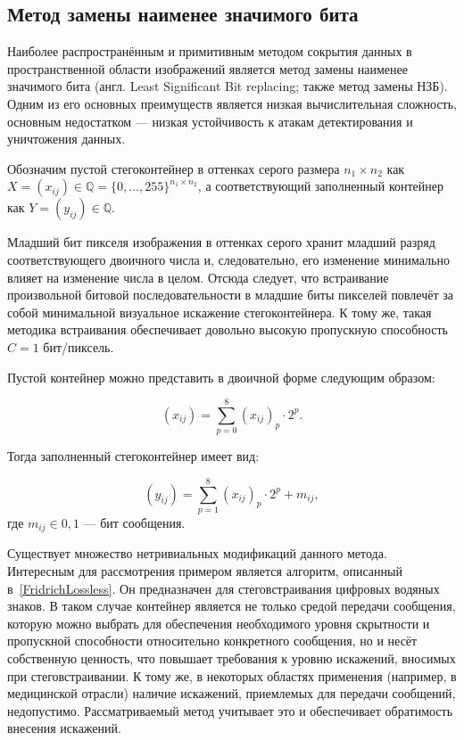 \subsection{Метод замены наименее значимого бита} \label{sec:LSB}

Наиболее распространённым и примитивным методом сокрытия данных в пространственной области изображений является метод замены наименее значимого бита (англ. Least Significant Bit replacing; также метод замены НЗБ). Одним из его основных преимуществ является низкая вычислительная сложность, основным недостатком --- низкая устойчивость к атакам детектирования и уничтожения данных.

Обозначим пустой стегоконтейнер в оттенках серого размера $ {n_1 \times n_2} $ как $ X = (x_{ij}) \in \mathbb{Q} = \{0, \dotsc, 255\}^{n_1 \times n_2} $, а соответствующий заполненный контейнер как $ Y = (y_{ij}) \in \mathbb{Q} $.

Младший бит пикселя изображения в оттенках серого хранит младший разряд соответствующего двоичного числа и, следовательно, его изменение минимально влияет на изменение числа в целом. Отсюда следует, что встраивание произвольной битовой последовательности в младшие биты пикселей повлечёт за собой минимальной визуальное искажение стегоконтейнера. К тому же, такая методика встраивания обеспечивает довольно высокую пропускную способность $ C = 1 $ бит/пиксель.

Пустой контейнер можно представить в двоичной форме следующим образом:

\begin{equation*}
(x_{ij}) = \sum_{p = 0}^8 (x_{ij})_p \cdot 2^p.
\end{equation*}

Тогда заполненный стегоконтейнер имеет вид:

\begin{equation*}
(y_{ij}) = \sum_{p = 1}^8 (x_{ij})_p \cdot 2^p + m_{ij},
\end{equation*}
где $ m_{ij} \in {0, 1} $ --- бит сообщения.

Существует множество нетривиальных модификаций данного метода. Интересным для рассмотрения примером является алгоритм, описанный в~\ref{FridrichLossless}. Он предназначен для стеговстраивания цифровых водяных знаков. В таком случае контейнер является не только средой передачи сообщения, которую можно выбрать для обеспечения необходимого уровня скрытности и пропускной способности относительно конкретного сообщения, но и несёт собственную ценность, что повышает требования к уровню искажений, вносимых при стеговстраивании. К тому же, в некоторых областях применения (например, в медицинской отрасли) наличие искажений, приемлемых для передачи сообщений, недопустимо. Рассматриваемый метод учитывает это и обеспечивает обратимость внесения искажений.

